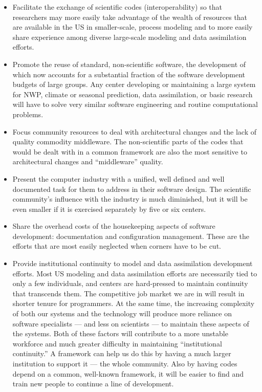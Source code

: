 \begin{itemize}

\item Facilitate the exchange of scientific codes
(interoperability) so that researchers may more easily take advantage
of the wealth of resources that are available in the US in
smaller-scale, process modeling and to more easily share experience
among diverse large-scale modeling and data assimilation efforts. 

\item Promote the reuse of standard, non-scientific software, the 
development of which now accounts for a substantial fraction of the
software development budgets of large groups. 
Any center developing or maintaining a large system for NWP, climate or
seasonal prediction, data assimilation, or basic research will have to
solve very similar software engineering and routine computational
problems.  

\item Focus community resources to deal with architectural changes
and the lack of quality commodity middleware. The non-scientific parts
of the codes that would be dealt with in a common framework are also the
most sensitive to architectural changes and ``middleware'' quality. 

\item Present the computer industry with a unified, well defined
and well documented task for them to address in their software design.
The scientific community's influence with the industry
is much diminished, but it will be even smaller if it is exercised
separately by five or six centers. 

\item Share the overhead costs of the housekeeping aspects of
software development: documentation and configuration management.  These
are the efforts that are most easily neglected when corners have to be
cut. 

\item Provide institutional continuity to model and data assimilation
 development efforts.  Most US modeling and data assimilation efforts
 are necessarily tied to only a few individuals, and centers are
 hard-pressed to maintain continuity that transcends them.  The
 competitive job market we are in will result in shorter tenure for
 programmers. At the same time, the increasing complexity of both our
 systems and the technology will produce more reliance on software
 specialists --- and less on scientists --- to maintain these aspects
 of the systems. Both of these factors will contribute to a more
 unstable workforce and much greater difficulty in maintaining
 ``institutional continuity.'' A framework can help us do this by
 having a much larger institution to support it --- the whole
 community.  Also by having codes depend on a common, well-known
 framework, it will be easier to find and train new people to continue
 a line of development.

\end{itemize}






